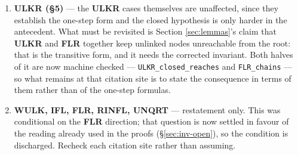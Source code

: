 \begin{enumerate}
  The empty cases were \textsc{Replace},
  \textsc{ReadHeap}, \textsc{WriteFreshField} and also \textsc{Alloc}, which this
  list previously missed; \textsc{Free} was worse than empty, folding
  \textbf{HD} into a blanket claim that all seventeen axioms are trivial.  Each
  is short, as expected: \textsc{ReadHeap} writes no field at all, the two field
  writes store a location the precondition already types as
  $\textsf{rcuItr}$ or $\textsf{rcuFresh}$ and hence already places in $dom(h)$,
  and \textsc{Alloc} only enlarges the domain with a node whose fields are all
  \textsf{null}.

  \textsc{Free} is the one that is not trivial, and it was the one dismissed as
  such: it is the only action that \emph{shrinks} $dom(h)$, so it must establish
  that no surviving edge points at the freed location.  That obligation is real
  rather than an artefact --- a state with a dangling predecessor satisfies
  \textbf{HD} before the free and violates it after
  (\texttt{HD\_h\_free\_needs\_no\_incoming}) --- and it is discharged from the
  transitive \textbf{ULKR} together with \textbf{FLR} and \textbf{IFL}.  The
  four preservation arguments are machine checked as \texttt{HD\_h\_upd},
  \texttt{HD\_h\_alloc} and \texttt{HD\_h\_free} in \texttt{rocq/HeapPaths.v}.

\item \textbf{ULKR (\S5)} --- the \textbf{ULKR} cases themselves are unaffected,
  since they establish the one-step form and the closed hypothesis is only
  harder in the antecedent.  What must be revisited is Section
  \ref{sec:lemmas}'s claim that \textbf{ULKR} and \textbf{FLR} together keep
  unlinked nodes unreachable from the root: that is the transitive form, and it
  needs the corrected invariant.  Both halves of it are now machine checked ---
  \texttt{ULKR\_closed\_reaches} and \texttt{FLR\_chains} --- so what remains at
  that citation site is to state the consequence in terms of them rather than of
  the one-step formulas.

\item \textbf{WULK, IFL, FLR, RINFL, UNQRT} --- restatement only.  This was
  conditional on the \textbf{FLR} direction; that question is now settled in
  favour of the reading already used in the proofs
  (\S\ref{sec:inv-open}), so the condition is discharged.  Recheck each citation
  site rather than assuming.
\end{enumerate}

